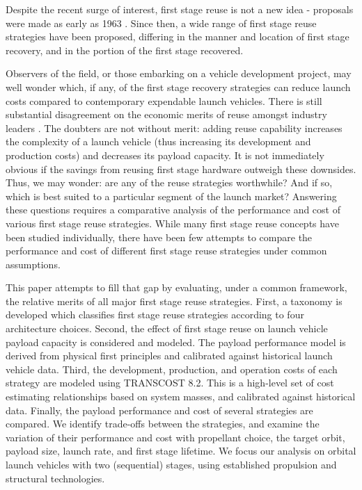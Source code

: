 \documentclass[conf]{new-aiaa}
\begin{document}
\begin{multicols}{2}
Despite the recent surge of interest, first stage reuse is not a new idea - proposals were made as early as 1963 \cite{Nexus, SeaDragon}. Since then, a wide range of first stage reuse strategies have been proposed, differing in the manner and location of first stage recovery, and in the portion of the first stage recovered.

Observers of the field, or those embarking on a vehicle development project, may well wonder which, if any, of the first stage recovery strategies can reduce launch costs compared to contemporary expendable launch vehicles. There is still substantial disagreement on the economic merits of reuse amongst industry leaders \cite{Cantrell17, Russell18, Selding16_orbital, Wall15, Selding16_spacex}. The doubters are not without merit: adding reuse capability increases the complexity of a launch vehicle (thus increasing its development and production costs) and decreases its payload capacity. It is not immediately obvious if the savings from reusing first stage hardware outweigh these downsides. Thus, we may wonder: are any of the reuse strategies worthwhile? And if so, which is best suited to a particular segment of the launch market? Answering these questions requires a comparative analysis of the performance and cost of various first stage reuse strategies. While many first stage reuse concepts have been studied individually, there have been few attempts to compare the performance and cost of different first stage reuse strategies under common assumptions.

This paper attempts to fill that gap by evaluating, under a common framework, the relative merits of all major first stage reuse strategies. First, a taxonomy is developed which classifies first stage reuse strategies according to four architecture choices. Second, the effect of first stage reuse on launch vehicle payload capacity is considered and modeled. The payload performance model is derived from physical first principles and calibrated against historical launch vehicle data. Third, the development, production, and operation costs of each strategy are modeled using TRANSCOST 8.2. This is a high-level set of cost estimating relationships based on system masses, and calibrated against historical data. Finally, the payload performance and cost of several strategies are compared. We identify trade-offs between the strategies, and examine the variation of their performance and cost with propellant choice, the target orbit, payload size, launch rate, and first stage lifetime. We focus our analysis on orbital launch vehicles with two (sequential) stages, using established propulsion and structural technologies.


\end{multicols}
\end{document}
